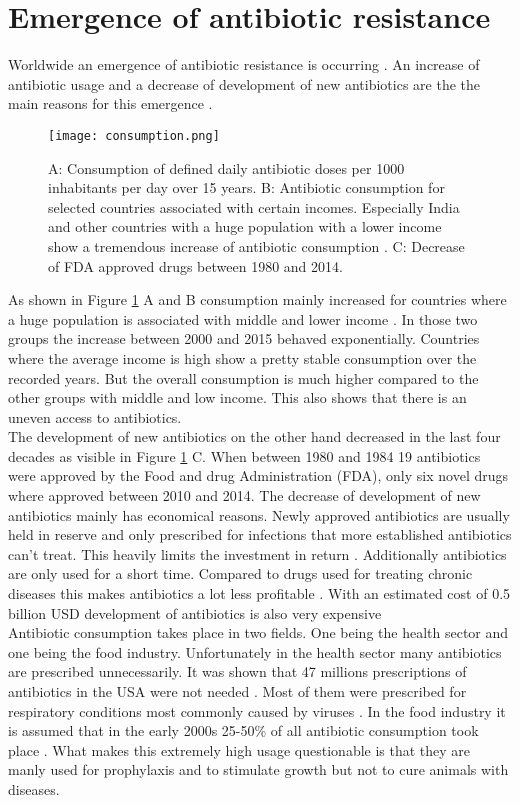 \section{Emergence of antibiotic resistance}
Worldwide an emergence of antibiotic resistance is occurring \cite{ventola_antibiotic_2015}. An increase of antibiotic usage and a decrease of development of new antibiotics are the the main reasons for this emergence \cite{ventola_antibiotic_2015}. 
\begin{figure}
	\texttt{[image: consumption.png]}
	\caption{A: Consumption of defined daily antibiotic doses per 1000 inhabitants per day over 15 years.  B: Antibiotic consumption for selected countries associated with certain incomes. Especially India and other countries with a huge population with a lower income show a tremendous increase of antibiotic consumption \cite{klein_global_2018}. C: Decrease of FDA approved drugs between 1980 and 2014.}
	\label{figure:emergence}
\end{figure}
As shown in Figure \ref{figure:emergence} A and B consumption mainly increased for countries where a huge population is associated with middle and lower income \cite{klein_global_2018}. In those two groups the increase between 2000 and 2015 behaved exponentially. Countries where the average income is high show a pretty stable consumption over the recorded years. But the overall consumption is much higher compared to the other groups with middle and low income. This also shows that there is an uneven access to antibiotics. \\
The development of new antibiotics on the other hand decreased in the last four decades as visible in Figure \ref{figure:emergence} C. When between 1980 and 1984 19 antibiotics were approved by the Food and drug  Administration (FDA), only six novel drugs where approved between 2010 and 2014. The decrease of development of new antibiotics mainly has economical reasons. Newly approved antibiotics are usually held in reserve and only prescribed for infections that more established antibiotics can't treat. This heavily limits the investment in return \cite{fair_antibiotics_2014}. Additionally antibiotics are only used for a short time. Compared to drugs used for treating chronic diseases this makes antibiotics a lot less profitable  \cite{fair_antibiotics_2014}. With an estimated cost of 0.5 billion USD development of antibiotics is also very expensive \cite{costs}\\
Antibiotic consumption takes place in two fields. One being the health sector and one being the food industry. Unfortunately in the health sector many antibiotics are prescribed unnecessarily. It was shown that 47 millions prescriptions of antibiotics in the USA were not needed \cite{noauthor_antibiotic_2019}. Most of them were prescribed for respiratory conditions most commonly caused by viruses \cite{noauthor_antibiotic_2019}. In the food industry it is assumed that in the early 2000s 25-50\% of all antibiotic consumption took place \cite{palumbi_humans_2001}. What makes this extremely high usage questionable is that they are manly used for prophylaxis and to stimulate growth but not to cure animals with diseases. \\
